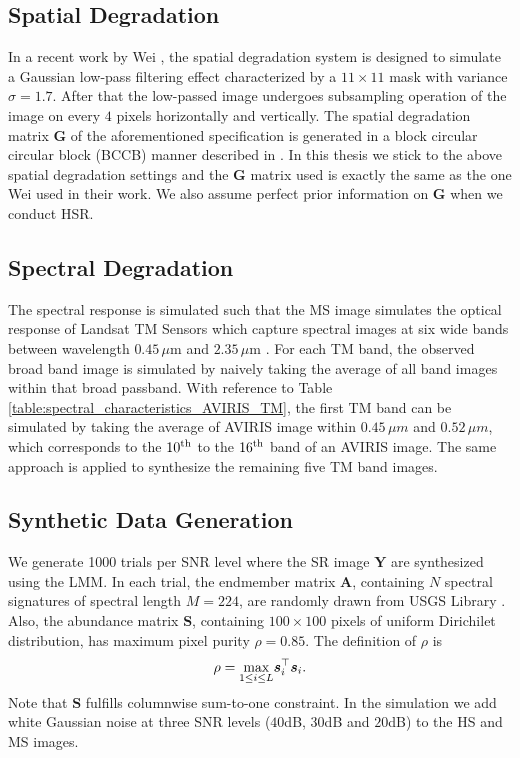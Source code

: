 \subsection{Spatial Degradation} \label{sec:SPATIAL_DEGRADE}
In a recent work by Wei \etal, the spatial degradation system is designed to
simulate a Gaussian low-pass filtering effect characterized by a
$11 \times 11$ mask with variance $\sigma = 1.7$.
After that the low-passed image undergoes subsampling operation of the image
on every $4$ pixels horizontally and vertically.
The spatial degradation matrix $\bm G$ of the aforementioned specification is
generated in a block circular circular block (BCCB) manner described in
\cite{FUMI}.
In this thesis we stick to the above spatial degradation settings and the
$\bm G$ matrix used is exactly the same as the one Wei \etal used in their work.
We also assume perfect prior information on $\bm G$ when we conduct HSR.

\subsection{Spectral Degradation} \label{sec:SPECTRAL_DEGRADE}
The spectral response is simulated such that the MS image simulates the optical
response of Landsat TM Sensors which capture spectral images at six wide bands
between wavelength $0.45\,\mu$m and $2.35\,\mu$m
\cite{MILITARY_UTILITY,
      LANDSAT_HANDBOOK}.
For each TM band, the observed broad band image is simulated by naively taking
the average of all band images within that broad passband.
With reference to Table \ref{table:spectral_characteristics_AVIRIS_TM}, the
first TM band can be simulated by taking the average of AVIRIS image within
$0.45\,\mu m$ and $0.52\,\mu m$, which corresponds to the $10^\text{th}$ to the
$16^\text{th}$ band of an AVIRIS image.
The same approach is applied to synthesize the remaining five TM band images.

\subsection{Synthetic Data Generation} \label{sec:data_gen_synt}
We generate 1000 trials per SNR level where the SR image $\bm Y$ are
synthesized using the LMM.
In each trial, the endmember matrix $\bm A$, containing $N$ spectral
signatures of spectral length $M = 224$, are randomly drawn from USGS Library
\cite{USGS}.
Also, the abundance matrix $\bm S$, containing $100 \times 100$ pixels of
uniform Dirichilet distribution, has maximum pixel purity $\rho = 0.85$.
The definition of $\rho$ is
\begin{equation}
    \rho = \underset{1 \leq i \leq L}{\max} \bm s_i^\top \bm s_i.
\end{equation}
Note that $\bm S$ fulfills columnwise sum-to-one constraint.
In the simulation we add white Gaussian noise at three SNR levels ($40$dB,
$30$dB and $20$dB) to the HS and MS images.

